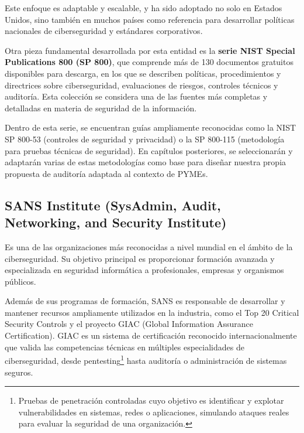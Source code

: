 \documentclass[a4paper, 11pt]{article}
\begin{document}
Este enfoque es adaptable y escalable, y ha sido adoptado no solo en Estados Unidos, sino también en muchos países como referencia para desarrollar políticas nacionales de ciberseguridad y estándares corporativos.

Otra pieza fundamental desarrollada por esta entidad es la \textbf{serie NIST Special Publications 800 (SP 800)}, que comprende más de 130 documentos gratuitos disponibles para descarga, en los que se describen políticas, procedimientos y directrices sobre ciberseguridad, evaluaciones de riesgos, controles técnicos y auditoría. Esta colección se considera una de las fuentes más completas y detalladas en materia de seguridad de la información. \cite{nistsp}

Dentro de esta serie, se encuentran guías ampliamente reconocidas como la NIST SP 800-53 (controles de seguridad y privacidad) o la SP 800-115 (metodología para pruebas técnicas de seguridad). En capítulos posteriores, se seleccionarán y adaptarán varias de estas metodologías como base para diseñar nuestra propia propuesta de auditoría adaptada al contexto de PYMEs.


\subsection*{SANS Institute (SysAdmin, Audit, Networking, and Security Institute)}

Es una de las organizaciones más reconocidas a nivel mundial en el ámbito de la ciberseguridad. Su objetivo principal es proporcionar formación avanzada y especializada en seguridad informática a profesionales, empresas y organismos públicos. \cite{sans}

Además de sus programas de formación, SANS es responsable de desarrollar y mantener recursos ampliamente utilizados en la industria, como el Top 20 Critical Security Controls y el proyecto GIAC (Global Information Assurance Certification). GIAC es un sistema de certificación reconocido internacionalmente que valida las competencias técnicas en múltiples especialidades de ciberseguridad, desde pentesting\footnote{Pruebas de penetración controladas cuyo objetivo es identificar y explotar vulnerabilidades en sistemas, redes o aplicaciones, simulando ataques reales para evaluar la seguridad de una organización.} hasta auditoría o administración de sistemas seguros. \cite{sanscert}
\end{document}
